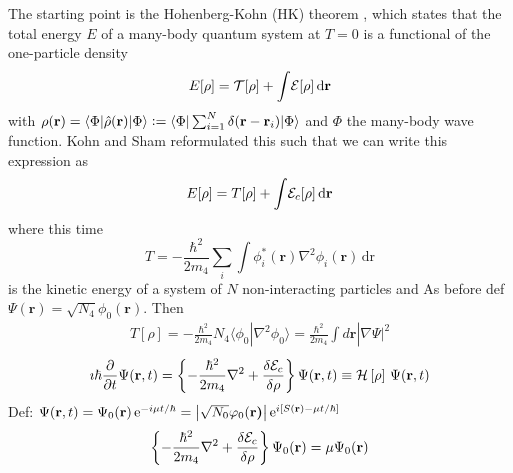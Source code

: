 \documentclass[11pt,a4paper,twoside]{article}
\renewcommand{\vec}[1]{\bm{\mathrm{#1}}}
\newcommand{\unit}[1]{\,\mathrm{#1}}
\newcommand{\diff}[1]{\,\mathrm{d}{#1}}
\begin{document}
			The starting point is the Hohenberg-Kohn (HK) theorem \cite{Hoh64}, which states that the total energy $E$ of a many-body quantum system at $T=0$ is a functional of the one-particle density
			\begin{align}
				E[\rho] = {\cal T}[\rho] +\int\!{\cal E}[\rho]\label{eq1}\diff{\vec{r}}
			\end{align}
			with $\rho ({\mathbf r})= \langle\Phi |\hat\rho(\vec{r})|\Phi \rangle \vcentcolon= \langle\Phi |\sum _{i=1}^{N} \delta ({\mathbf r}-{\mathbf r}_i)|\Phi \rangle$ and $\Phi$ the many-body wave function.
			Kohn and Sham reformulated this such that we can write this expression as 
			\begin{equation}
				E[\rho] = T[\rho] + \int\!{\cal E}_c[\rho]\diff{\vec{r}} \label{eq2}
			\end{equation}
			where this time
			\begin{equation}
				T= -\frac{\hbar^2}{2m_4} \sum_i \int\! \phi _i^\ast ({\mathbf r})\nabla^2  \phi _i ({\mathbf r})\diff{\vec{r}} \label{eq3}
			\end{equation}
			is the kinetic energy of a system of $N$ non-interacting particles and 
			As before def $\Psi(\textbf{r}) = \sqrt{N_4} \phi_0(\textbf{r})$. Then
			\begin{align}
				T[\rho] =
				-\frac{\hbar^2}{2m_4} N_4 \langle \phi_0 | \nabla^2 \phi_0\rangle = \frac{\hbar^2}{2m_4} \int d {\mathbf r} |\nabla \Psi|^2 \label{eq5}
			\end{align}
			\begin{align}
				\imath \hbar\frac{\partial}{\partial t} \Psi({\mathbf r},t) = \left\{-\frac{\hbar^2}{2m_4}\nabla^2 + \frac{\delta{\cal E}_{c}}{\delta\rho}\right\}\Psi(\textbf{r},t)  \equiv {\cal H}\left[\rho\right] \,\Psi(\textbf{r},t) 
				\label{eq6}
			\end{align}
Def: $\Psi(\vec{r},t) = \Psi_0(\vec{r})\unit{e}^{-i\mu t/\hbar}=\absolutevalue{\sqrt{N_0}\varphi_0(\vec{r)}}\unit{e}^{i\qty[S(\vec{r})-\mu t/\hbar]}$
			\begin{align}
			\left\{-\frac{\hbar^2}{2m_4} \nabla^2 + \frac{\delta {\cal E}_{c}}{\delta \rho}\right\}\Psi_0(\textbf{r}) = \mu \Psi_0(\textbf{r})
			\label{eq7}
			\end{align}
			
\end{document}

